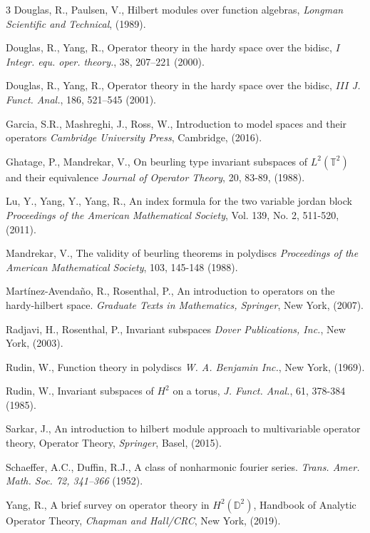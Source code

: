 \documentclass[12pt,reqno]{amsart}
\theoremstyle{definition}
\theoremstyle{definition}
\numberwithin{equation}{section}
\begin{document}
\begin{thebibliography}{3}
 Douglas, R., Paulsen, V., Hilbert modules over function algebras, {\it Longman Scientific and Technical}, (1989).

 Douglas, R., Yang, R., Operator theory in the hardy space over the bidisc, $I$ {\it Integr. equ. oper. theory.}, 38, 207–221 (2000).

 Douglas, R., Yang, R., Operator theory in the hardy space over the bidisc, $III$ {\it J. Funct. Anal.}, 186, 521–545 (2001).

 Garcia, S.R., Mashreghi, J., Ross, W., Introduction to model spaces and their operators {\it Cambridge University Press}, Cambridge, (2016).

 Ghatage, P., Mandrekar, V., On beurling type invariant subspaces of $L^2(\mathbb{T}^2)$ and their equivalence {\it Journal of Operator Theory}, 20, 83-89, (1988).

 Lu, Y., Yang, Y., Yang, R., An index formula for the two variable jordan block {\it Proceedings of the American Mathematical Society}, Vol. 139, No. 2, 511-520, (2011).

 Mandrekar, V., The validity of beurling theorems in polydiscs {\it Proceedings of the American Mathematical Society}, 103, 145-148 (1988).

 Martínez-Avendaño, R., Rosenthal, P., An introduction to operators on the hardy-hilbert space.
{\it Graduate Texts in Mathematics, Springer}, New York, (2007).

 Radjavi, H., Rosenthal, P., Invariant subspaces {\it Dover Publications, Inc.}, New York, (2003).
    
 Rudin, W., Function theory in polydiscs {\it W. A. Benjamin Inc.}, New York, (1969).

 Rudin, W., Invariant subspaces of $H^2$ on a torus, {\it J. Funct. Anal.}, 61, 378-384 (1985).

 Sarkar, J., An introduction to hilbert module approach to multivariable operator theory, Operator Theory, {\it Springer}, Basel,  (2015).

 Schaeffer, A.C., Duffin, R.J., A class of nonharmonic fourier series.
\textsl{Trans. Amer. Math. Soc. 72, 341–366} (1952).

 Yang, R., A brief survey on operator theory in $H^2(\mathbb{D}^2)$, Handbook of Analytic Operator Theory, {\it Chapman and Hall/CRC}, New York, (2019).

\end{thebibliography}
\end{document}
